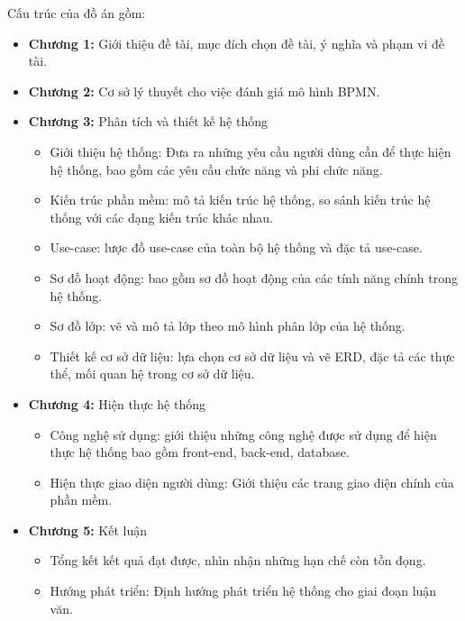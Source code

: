 Cấu trúc của đồ án gồm:
\begin{itemize}
    \item \textbf{Chương 1:} Giới thiệu đề tài, mục đích chọn đề tài, ý nghĩa và phạm vi đề tài.
    \item \textbf{Chương 2:} Cơ sở lý thuyết cho việc đánh giá mô hình BPMN.
    \item \textbf{Chương 3:} Phân tích và thiết kế hệ thống
    \begin{itemize}
        \item Giới thiệu hệ thống: Đưa ra những yêu cầu người dùng cần để thực hiện hệ thống, bao gồm các yêu cầu chức năng và phi chức năng.
        \item Kiến trúc phần mềm: mô tả kiến trúc hệ thống, so sánh kiến trúc hệ thống với các dạng kiến trúc khác nhau.
        \item Use-case: lược đồ use-case của toàn bộ hệ thống và đặc tả use-case.
        \item Sơ đồ hoạt động: bao gồm sơ đồ hoạt động của các tính năng chính trong hệ thống.
        \item Sơ đồ lớp: vẽ và mô tả lớp theo mô hình phân lớp của hệ thống.
        \item Thiết kế cơ sở dữ liệu: lựa chọn cơ sở dữ liệu và vẽ ERD, đặc tả các thực thể, mối quan hệ trong cơ sở dữ liệu.
    \end{itemize}
    \item \textbf{Chương 4:} Hiện thực hệ thống
    \begin{itemize}
        \item Công nghệ sử dụng: giới thiệu những công nghệ được sử dụng để hiện thực hệ thống bao gồm front-end, back-end, database.
        \item Hiện thực giao diện người dùng: Giới thiệu các trang giao diện chính của phần mềm.
    \end{itemize}
    \item \textbf{Chương 5:} Kết luận
    \begin{itemize}
        \item Tổng kết kết quả đạt được, nhìn nhận những hạn chế còn tồn đọng.
        \item Hướng phát triển: Định hướng phát triển hệ thống cho giai đoạn luận văn.
    \end{itemize}
\end{itemize}